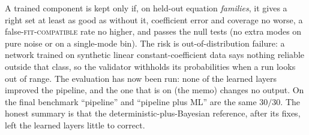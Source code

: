 \begin{caution}[title=Acceptance rule and the risk]
A trained component is kept only if, on held-out equation \emph{families}, it gives a right set at least as good as without it, coefficient error and coverage no worse, a false-\textsc{fit-compatible} rate no higher, and passes the null tests (no extra modes on pure noise or on a single-mode bin). The risk is out-of-distribution failure: a network trained on synthetic linear constant-coefficient data says nothing reliable outside that class, so the validator withholds its probabilities when a run looks out of range. The evaluation has now been run: none of the learned layers improved the pipeline, and the one that is on (the memo) changes no output. On the final benchmark ``pipeline'' and ``pipeline plus ML'' are the same $30/30$. The honest summary is that the deterministic-plus-Bayesian reference, after its fixes, left the learned layers little to correct.
\end{caution}
